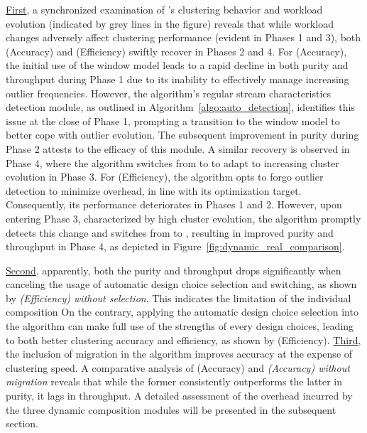 \underline{First}, a synchronized examination of \algo's clustering behavior and workload evolution (indicated by grey lines in the figure) reveals that while workload changes adversely affect clustering performance (evident in Phases 1 and 3), both \algo (Accuracy) and \algo (Efficiency) swiftly recover in Phases 2 and 4. For \algo (Accuracy), the initial use of the \damped window model leads to a rapid decline in both purity and throughput during Phase 1 due to its inability to effectively manage increasing outlier frequencies. However, the algorithm's regular stream characteristics detection module, as outlined in Algorithm~\ref{algo:auto_detection}, identifies this issue at the close of Phase 1, prompting a transition to the \landmark window model to better cope with outlier evolution. The subsequent improvement in purity during Phase 2 attests to the efficacy of this module. A similar recovery is observed in Phase 4, where the algorithm switches from \CFT to \MCs to adapt to increasing cluster evolution in Phase 3. For \algo (Efficiency), the algorithm opts to forgo outlier detection to minimize overhead, in line with its optimization target. Consequently, its performance deteriorates in Phases 1 and 2. However, upon entering Phase 3, characterized by high cluster evolution, the algorithm promptly detects this change and switches from \Grids to \DPT, resulting in improved purity and throughput in Phase 4, as depicted in Figure~\ref{fig:dynamic_real_comparison}.

\underline{Second}, apparently, both the purity and throughput drops significantly when canceling the usage of automatic design choice selection and switching, as shown by \algo \textit{(Efficiency) without selection}.  This indicates the limitation of the individual composition
On the contrary, applying the automatic design choice selection into the algorithm can make full use of the strengths of every design choices, leading to both better clustering accuracy and efficiency, as shown by \algo (Efficiency). \underline{Third}, the inclusion of migration in the algorithm improves accuracy at the expense of clustering speed. A comparative analysis of \algo (Accuracy) and \algo \textit{(Accuracy) without migration} reveals that while the former consistently outperforms the latter in purity, it lags in throughput. A detailed assessment of the overhead incurred by the three dynamic composition modules will be presented in the subsequent section.

